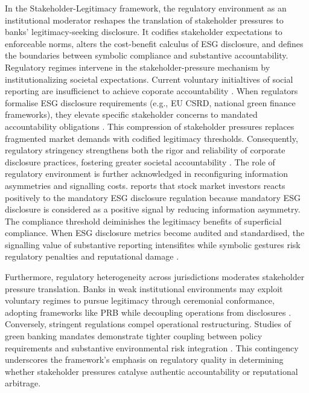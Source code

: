 \documentclass[
  authoryear]{elsarticle}
\begin{document}
In the Stakeholder-Legitimacy framework, the regulatory environment as
an institutional moderator reshapes the translation of stakeholder
pressures to banks' legitimacy-seeking disclosure. It codifies
stakeholder expectations to enforceable norms, alters the cost-benefit
calculus of ESG disclosure, and defines the boundaries between symbolic
compliance and substantive accountability. Regulatory regimes intervene
in the stakeholder-pressure mechanism by \hspace{0pt}institutionalizing
societal expectations.\hspace{0pt}\hspace{0pt} Current voluntary
initialtives of social reporting are insufficienct to achieve coporate
accountability \citep{HESS2007}. When regulators formalise ESG
disclosure requirements (e.g., EU CSRD, national green finance
frameworks), they elevate specific stakeholder concerns to mandated
accountability obligations \citep{QU2007}. This \hspace{0pt}compression
of stakeholder pressures\hspace{0pt} replaces fragmented market demands
with codified legitimacy thresholds. Consequently, regulatory stringency
strengthens both the rigor and reliability of corporate disclosure
practices, fostering greater societal accountability
\citep{CICCHIELLO2023}. The role of regulatory environment is further
acknowledged in \hspace{0pt}reconfiguring information asymmetries and
signalling costs. \hspace{0pt}\citet{DESAI2024} reports that stock
market investors reacts positively to the mandatory ESG disclosure
regulation because mandatory ESG disclosure is considered as a positive
signal by reducing information asymmetry. The compliance threshold
deiminishes the legitimacy benefits of superficial compliance. When ESG
disclosure metrics become audited and standardised, the signalling value
of substantive reporting intensifites while symbolic gestures risk
regulatory penalties and reputational damage
\citep{DESAI2024, BOSE2018}.

Furthermore, regulatory heterogeneity across jurisdictions
\hspace{0pt}moderates stakeholder pressure
translation.\hspace{0pt}\hspace{0pt} Banks in weak institutional
environments may exploit voluntary regimes to pursue legitimacy through
ceremonial conformance, adopting frameworks like PRB while decoupling
operations from disclosures \citep{MANOS2024}. Conversely, stringent
regulations compel operational restructuring. Studies of green banking
mandates demonstrate tighter coupling between policy requirements and
substantive environmental risk integration \citep{BOSE2018}. This
contingency underscores the framework's emphasis on regulatory quality
in determining whether stakeholder pressures catalyse authentic
accountability or reputational arbitrage.
\end{document}
